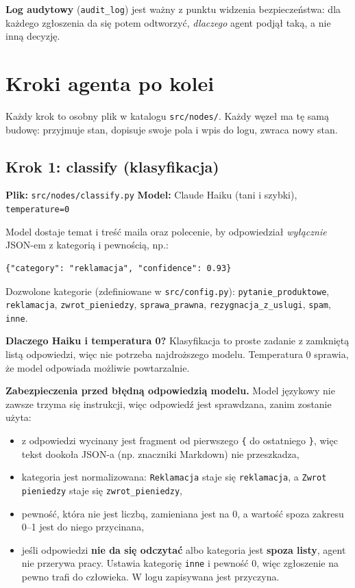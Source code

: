 \documentclass[11pt,a4paper]{article}
\newcommand{\plik}[1]{\texttt{#1}}
\begin{document}
\textbf{Log audytowy} (\texttt{audit\_log}) jest ważny z punktu widzenia
bezpieczeństwa: dla każdego zgłoszenia da się potem odtworzyć, \emph{dlaczego}
agent podjął taką, a nie inną decyzję.

\section{Kroki agenta po kolei}

Każdy krok to osobny plik w katalogu \plik{src/nodes/}. Każdy węzeł ma tę samą
budowę: przyjmuje stan, dopisuje swoje pola i wpis do logu, zwraca nowy stan.

\subsection{Krok 1: classify (klasyfikacja)}

\textbf{Plik:} \plik{src/nodes/classify.py}\quad
\textbf{Model:} Claude Haiku (tani i szybki), \texttt{temperature=0}

Model dostaje temat i treść maila oraz polecenie, by odpowiedział
\emph{wyłącznie} JSON-em z kategorią i pewnością, np.:

\begin{lstlisting}
{"category": "reklamacja", "confidence": 0.93}
\end{lstlisting}

Dozwolone kategorie (zdefiniowane w \plik{src/config.py}):
\texttt{pytanie\_produktowe}, \texttt{reklamacja}, \texttt{zwrot\_pieniedzy},
\texttt{sprawa\_prawna}, \texttt{rezygnacja\_z\_uslugi}, \texttt{spam},
\texttt{inne}.

\textbf{Dlaczego Haiku i temperatura 0?} Klasyfikacja to proste zadanie
z zamkniętą listą odpowiedzi, więc nie potrzeba najdroższego modelu.
Temperatura 0 sprawia, że model odpowiada możliwie powtarzalnie.

\textbf{Zabezpieczenia przed błędną odpowiedzią modelu.} Model językowy nie
zawsze trzyma się instrukcji, więc odpowiedź jest sprawdzana, zanim zostanie
użyta:

\begin{itemize}
  \item z odpowiedzi wycinany jest fragment od pierwszego \texttt{\{} do
        ostatniego \texttt{\}}, więc tekst dookoła JSON-a (np. znaczniki
        Markdown) nie przeszkadza,
  \item kategoria jest normalizowana: \texttt{Reklamacja} staje się
        \texttt{reklamacja}, a \texttt{Zwrot pieniedzy} staje się
        \texttt{zwrot\_pieniedzy},
  \item pewność, która nie jest liczbą, zamieniana jest na 0, a wartość
        spoza zakresu 0--1 jest do niego przycinana,
  \item jeśli odpowiedzi \textbf{nie da się odczytać} albo kategoria jest
        \textbf{spoza listy}, agent nie przerywa pracy. Ustawia kategorię
        \texttt{inne} i pewność 0, więc zgłoszenie na pewno trafi do
        człowieka. W logu zapisywana jest przyczyna.
\end{itemize}
\end{document}

